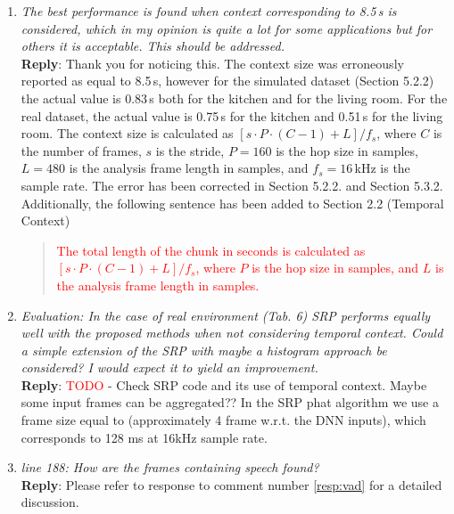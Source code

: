 \documentclass[11pt, technote, letterpaper, oneside, onecolumn]{IEEEtran}
\begin{document}
\begin{enumerate}
\item \textit{The best performance is found when context corresponding to 8.5\,s is considered, which in my opinion is quite a lot for some applications but for others it is acceptable. This should be addressed.\\}
\textbf{Reply}:  Thank you for noticing this. The context size was erroneously reported as equal to 8.5\,s, however for the simulated dataset (Section 5.2.2) the actual value is 0.83\,s both for the kitchen and for the living room. For the real dataset, the actual value is 0.75\,s for the kitchen and 0.51\,s for the living room. The context size is calculated as $\left [s\cdot P \cdot(C-1)+L \right ]/f_s$, where $C$ is the number of frames, $s$ is the stride, $P=160$ is the hop size in samples,  $L=480$ is the analysis frame length in samples, and $f_s=16$\,kHz is the sample rate. The error has been corrected in Section 5.2.2. and Section 5.3.2. Additionally, the following sentence has been added to Section 2.2 (Temporal Context)

\begin{quote}
\textcolor{red}{The total length of the chunk in seconds is calculated as $\left [s\cdot P \cdot(C-1)+L \right ]/f_s$, where $P$ is the hop size in samples, and $L$ is the analysis frame length in samples.}
\end{quote}


\item \textit{Evaluation: In the case of real environment (Tab. 6) SRP performs equally well with the proposed methods when not considering temporal context. Could a simple extension of the SRP with maybe a histogram approach be considered? I would expect it to yield an improvement.\\}
\textbf{Reply}: \textcolor{red}{TODO} - Check SRP code and its use of temporal context. Maybe some input frames can be aggregated??
In the SRP phat algorithm we use a frame size equal to  (approximately 4 frame w.r.t. the DNN inputs), which corresponds to 128 ms at 16kHz sample rate.

\item \textit{line 188: How are the frames containing speech found?\\}
\textbf{Reply}: Please refer to response to comment number \ref{resp:vad} for a detailed discussion.


\end{enumerate}
\end{document}
